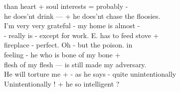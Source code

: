 \documentclass[11pt,a4paper]{article}
\begin{document}
{than heart + soul interests = probably - \\
he does'nt drink --- + he does'nt chase the floosies. \\
I'm very very grateful - my home is almost - \\
- really is - except for work. E. has to feed stove + \\
fireplace - perfect. Oh - but the poison. in \\
feeling - he  who is bone of my bone + \\
flesh of my flesh --- is still made my adversary. \\
He will torture me + - as he says - quite unintentionally \\
 Unintentionally ! + he so intelligent ?}

\end{document}

